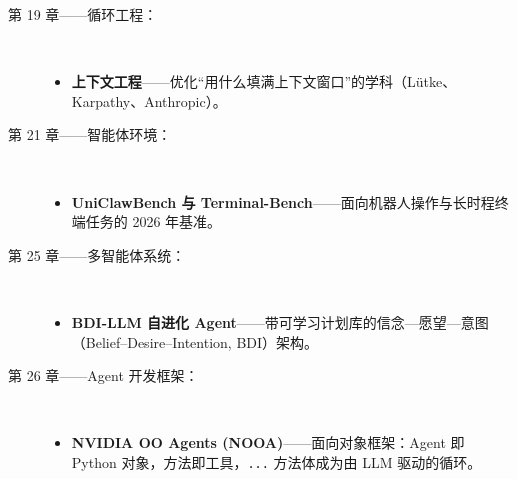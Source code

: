 \documentclass[11pt,a4paper,openany]{book}
\begin{document}
\begin{description}
  \item[第 19 章——循环工程：]~
    \begin{itemize}
      \item \textbf{上下文工程}——优化“用什么填满上下文窗口”的学科（Lütke、Karpathy、Anthropic）。
    \end{itemize}

  \item[第 21 章——智能体环境：]~
    \begin{itemize}
      \item \textbf{UniClawBench 与 Terminal-Bench}——面向机器人操作与长时程终端任务的 2026 年基准。
    \end{itemize}

  \item[第 25 章——多智能体系统：]~
    \begin{itemize}
      \item \textbf{BDI-LLM 自进化 Agent}——带可学习计划库的信念—愿望—意图（Belief--Desire--Intention, BDI）架构。
    \end{itemize}

  \item[第 26 章——Agent 开发框架：]~
    \begin{itemize}
      \item \textbf{NVIDIA OO Agents (NOOA)}——面向对象框架：Agent 即 Python 对象，方法即工具，\texttt{...} 方法体成为由 LLM 驱动的循环。
    \end{itemize}
\end{description}
\end{document}
